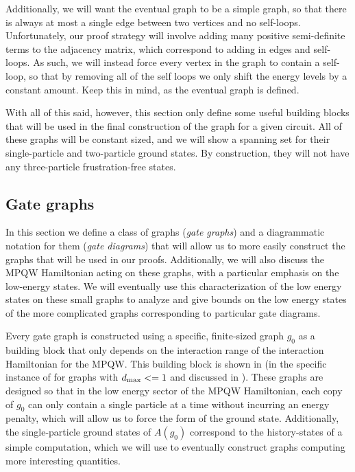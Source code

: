 \documentclass[../thesis-main/thesis-main]{subfiles}
\begin{document}
Additionally, we will want the eventual graph to be a simple graph, so that there is always at most a single edge between two vertices and no self-loops.  Unfortunately, our proof strategy will involve adding many positive semi-definite terms to the adjacency matrix, which correspond to adding in edges and self-loops.  As such, we will instead force every vertex in the graph to contain a self-loop, so that by removing all of the self loops we only shift the energy levels by a constant amount.  Keep this in mind, as the eventual graph is defined.

With all of this said, however, this section only define some useful building blocks that will be used in the final construction of the graph for a given circuit.  All of these graphs will be constant sized, and we will show a spanning set for their single-particle and two-particle ground states.  By construction, they will not have any three-particle frustration-free states.

\subsection{Gate graphs}\label{sec:gate_graphs}

In this section we define a class of graphs (\emph{gate graphs}) and a diagrammatic notation for them (\emph{gate diagrams}) that will allow us to more easily construct the graphs that will be used in our proofs.  Additionally, we will also discuss the MPQW Hamiltonian acting on these graphs, with a particular emphasis on the low-energy states.  We will eventually use this characterization of the low energy states on these small graphs to analyze and give bounds on the low energy states of the more complicated graphs corresponding to particular gate diagrams.

Every gate graph is constructed using a specific, finite-sized graph $g_{0}$ as a building block that only depends on the interaction range of the interaction Hamiltonian for the MPQW.  This building block is shown in  (in the specific instance of for graphs with $d_{\text{max}} <= 1$ and discussed in ).  These graphs are designed so that in the low energy sector of the MPQW Hamiltonian, each copy of $g_0$ can only contain a single particle at a time without incurring an energy penalty, which will allow us to force the form of the ground state.  Additionally, the single-particle ground states of $A(g_0)$ correspond to the history-states of a simple computation, which we will use to eventually construct graphs computing more interesting quantities.  
\end{document}
